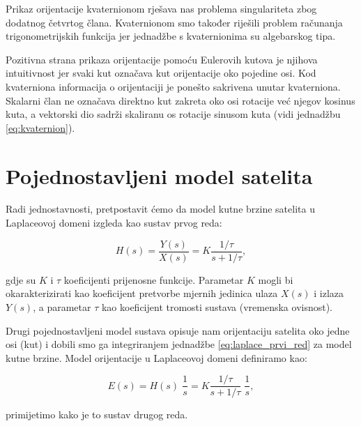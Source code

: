 \documentclass[times, utf8, diplomski, numeric]{templates/template}
\begin{document}
{{        Prikaz orijentacije kvaternionom rješava nas problema singulariteta zbog dodatnog četvrtog člana. Kvaternionom smo također riješili problem računanja trigonometrijskih funkcija jer jednadžbe s kvaternionima su algebarskog tipa.

        Pozitivna strana prikaza orijentacije pomoću Eulerovih kutova je njihova intuitivnost jer svaki kut označava kut orijentacije oko pojedine osi. Kod kvaterniona informacija o orijentaciji je ponešto sakrivena unutar kvaterniona. Skalarni član ne označava direktno kut zakreta oko osi rotacije već njegov kosinus kuta, a vektorski dio sadrži skaliranu os rotacije sinusom kuta (vidi jednadžbu \ref{eq:kvaternion}).
    }

    \section{Pojednostavljeni model satelita}{
    \label{section:pojednostavljeni_model_satelita}
        Radi jednostavnosti, pretpostavit ćemo da model kutne brzine satelita u Laplaceovoj domeni izgleda kao sustav prvog reda:
        
        \begin{equation}
        \label{eq:laplace_prvi_red}
        H(s) = \frac{Y(s)}{X(s)} = K \frac{1/\tau}{s + 1/\tau},
        \end{equation}

        gdje su $K$ i $\tau$ koeficijenti prijenosne funkcije. Parametar $K$ mogli bi okarakterizirati kao koeficijent pretvorbe mjernih jedinica ulaza $X(s)$ i izlaza $Y(s)$, a parametar $\tau$ kao koeficijent tromosti sustava (vremenska ovisnost).

        Drugi pojednostavljeni model sustava opisuje nam orijentaciju satelita oko jedne osi (kut) i dobili smo ga integriranjem jednadžbe \ref{eq:laplace_prvi_red} za model kutne brzine. Model orijentacije u Laplaceovoj domeni definiramo kao:

        \begin{equation}
        \label{eq:laplace_drugi_red}
            E(s) = H(s) \; \frac{1}{s} = K \frac{1/\tau}{s + 1/\tau} \; \frac{1}{s},
        \end{equation}

        primijetimo kako je to sustav drugog reda.
    }
}
\end{document}
